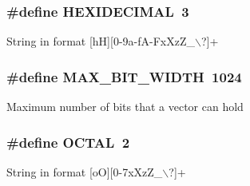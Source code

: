 \subsubsection{\setlength{\rightskip}{0pt plus 5cm}\#define HEXIDECIMAL\ 3}\label{group__lexer__val__types_a4}


String in format [h\-H][0-9a-f\-A-Fx\-Xz\-Z\_\-$\backslash$?]+ 
\subsubsection{\setlength{\rightskip}{0pt plus 5cm}\#define MAX\_\-BIT\_\-WIDTH\ 1024}\label{group__lexer__val__types_a0}


Maximum number of bits that a vector can hold 
\subsubsection{\setlength{\rightskip}{0pt plus 5cm}\#define OCTAL\ 2}\label{group__lexer__val__types_a3}


String in format [o\-O][0-7x\-Xz\-Z\_\-$\backslash$?]+ 